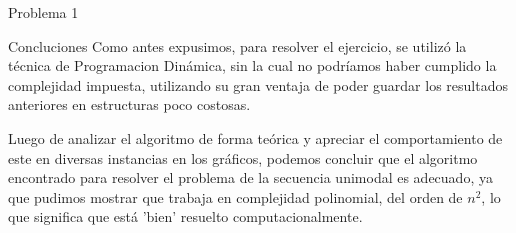 \begin{section}{Problema 1}
\begin{subsection}{Concluciones}
		Como antes expusimos, para resolver el ejercicio, se utilizó la técnica de Programacion Dinámica, sin la cual no podríamos haber cumplido la complejidad impuesta, utilizando su gran ventaja de poder guardar los resultados anteriores en estructuras poco costosas.
		
		Luego de analizar el algoritmo de forma teórica y apreciar el comportamiento de este en diversas instancias en los gráficos, podemos concluir que el algoritmo encontrado para resolver el problema de la secuencia unimodal es adecuado, ya que pudimos mostrar que trabaja en complejidad polinomial, del orden de $n^2$, lo que significa que está 'bien' resuelto computacionalmente.
	\end{subsection}
\end{section}

